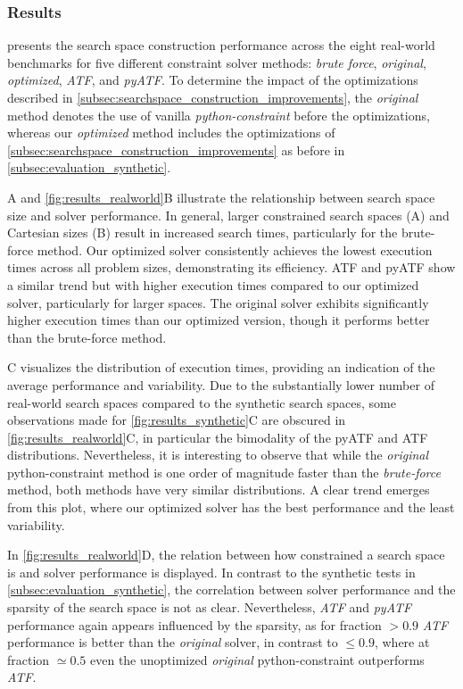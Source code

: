 \subsubsection{Results} \label{subsubsec:evaluation_real-world_results}
 presents the search space construction performance across the eight real-world benchmarks for five different constraint solver methods: \textit{brute force}, \textit{original}, \textit{optimized}, \textit{ATF}, and \textit{pyATF}. 
To determine the impact of the optimizations described in \cref{subsec:searchspace_construction_improvements}, the \textit{original} method denotes the use of vanilla \textit{python-constraint} before the optimizations, whereas our \textit{optimized} method includes the optimizations of \cref{subsec:searchspace_construction_improvements} as before in \cref{subsec:evaluation_synthetic}. 

A and \cref{fig:results_realworld}B illustrate the relationship between search space size and solver performance. In general, larger constrained search spaces (A) and Cartesian sizes (B) result in increased search times, particularly for the brute-force method. Our optimized solver consistently achieves the lowest execution times across all problem sizes, demonstrating its efficiency. ATF and pyATF show a similar trend but with higher execution times compared to our optimized solver, particularly for larger spaces. The original solver exhibits significantly higher execution times than our optimized version, though it performs better than the brute-force method.

C visualizes the distribution of execution times, providing an indication of the average performance and variability. 
Due to the substantially lower number of real-world search spaces compared to the synthetic search spaces, some observations made for \cref{fig:results_synthetic}C are obscured in \cref{fig:results_realworld}C, in particular the bimodality of the pyATF and ATF distributions. 
Nevertheless, it is interesting to observe that while the \textit{original} python-constraint method is one order of magnitude faster than the \textit{brute-force} method, both methods have very similar distributions. 
A clear trend emerges from this plot, where our optimized solver has the best performance and the least variability. 

In \cref{fig:results_realworld}D, the relation between how constrained a search space is and solver performance is displayed. 
In contrast to the synthetic tests in \cref{subsec:evaluation_synthetic}, the correlation between solver performance and the sparsity of the search space is not as clear. 
Nevertheless, \textit{ATF} and \textit{pyATF} performance again appears influenced by the sparsity, as for fraction $> 0.9$ \textit{ATF} performance is better than the \textit{original} solver, in contrast to $\leq 0.9$, where at fraction $\simeq 0.5$ even the unoptimized \textit{original} python-constraint outperforms \textit{ATF}. 

